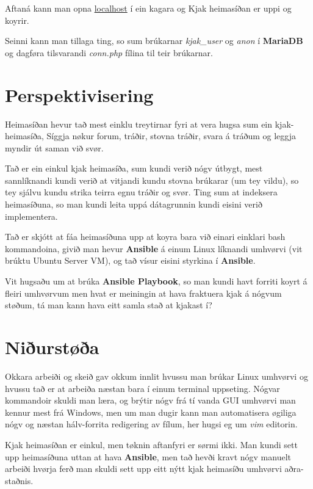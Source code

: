 \documentclass{article}
\begin{document}
 Aftaná kann man opna \underline{localhost} í ein kagara og Kjak heimasíðan er uppi
 og koyrir.

 \par Seinni kann man tillaga ting, so sum brúkarnar \textit{kjak\_user} og \textit{anon}
í \textbf{MariaDB} og dagføra tilsvarandi \textit{conn.php} fílina til teir brúkarnar.


\section{Perspektivisering}
\par Heimasíðan hevur tað mest einklu treytirnar fyri at vera hugsa sum ein kjak-heimasíða,
Síggja nøkur forum, tráðir, stovna tráðir, svara á tráðum og leggja myndir út saman við svør.
\par Tað er ein einkul kjak heimasíða, sum kundi verið nógv útbygt, mest sannlíknandi
kundi verið at vitjandi kundu stovna brúkarar (um tey vildu), so tey sjálvu kundu strika
teirra egnu tráðir og svør. Ting sum at indeksera heimasíðuna, so man kundi leita uppá
dátagrunnin kundi eisini verið implementera.
\par Tað er skjótt at fáa heimasíðuna upp at koyra bara við einari einklari bash kommandoina,
givið man hevur \textbf{Ansible} á einum
Linux líknandi umhvørvi (vit brúktu Ubuntu Server VM), og tað vísur eisini styrkina í \textbf{Ansible}.
\par Vit hugsaðu um at brúka \textbf{Ansible Playbook}, so man kundi havt forriti koyrt á 
fleiri umhvørvum men hvat er meiningin at hava fraktuera kjak á nógvum støðum, tá man kann hava
eitt samla stað at kjakast í?

\section{Niðurstøða}
\par Okkara arbeiði og skeið gav okkum innlit hvussu man brúkar Linux umhvørvi og hvussu tað
er at arbeiða næstan bara í einum terminal uppseting. Nógvar kommandoir skuldi man læra, og
brýtir nógv frá tí vanda GUI umhvørvi man kennur mest frá Windows, men um man dugir kann man
automatisera øgiliga nógv og næstan hálv-forrita redigering av fílum, her hugsi eg um \textit{vim}
editorin.
\par Kjak heimasíðan er einkul, men tøknin aftanfyri er sørmi ikki. Man kundi sett upp heimasíðuna
uttan at hava \textbf{Ansible}, men tað hevði kravt nógv manuelt arbeiði hvørja ferð man skuldi
sett upp eitt nýtt kjak heimasíðu umhvørvi aðra-staðnis.
\end{document}
